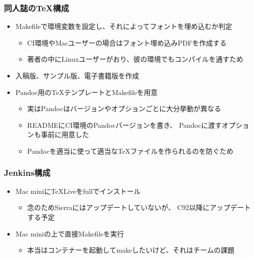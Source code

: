 \begin{frame}
  \frametitle{同人誌の\TeX 構成}

  \begin{itemize}
    \item<1-> Makefileで環境変数を設定し、それによってフォントを埋め込むか判定
    \begin{itemize}
      \item CI環境やMacユーザーの場合はフォント埋め込みPDFを作成する
      \item 著者の中にLinuxユーザーがおり、彼の環境でもコンパイルを通すため
    \end{itemize}

    \item<2-> 入稿版、サンプル版、電子書籍版を作成

    \item<3-> Pandoc用の\TeX テンプレートとMakefileを用意
    \begin{itemize}
      \item 実はPandocはバージョンやオプションごとに大分挙動が異なる
      \item READMEにCI環境のPandocバージョンを書き、
      Pandocに渡すオプションも事前に用意した
      \item Pandocを適当に使って適当な\TeX ファイルを作られるのを防ぐため
    \end{itemize}
  \end{itemize}
\end{frame}

\begin{frame}
  \frametitle{Jenkins構成}

  \begin{itemize}
    \item<2-> Mac miniに\TeX Liveをfullでインストール
    \begin{itemize}
      \item 念のためSierraにはアップデートしていないが、
      C92以降にアップデートする予定
    \end{itemize}
    
    \item<3-> Mac miniの上で直接Makefileを実行
    \begin{itemize}
      \item 本当はコンテナーを起動してmakeしたいけど、それはチームの課題
    \end{itemize}
  \end{itemize}
\end{frame}

